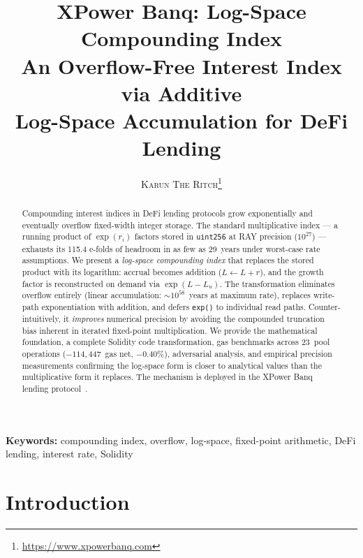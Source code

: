 \documentclass[10pt,a4paper,twocolumn]{article}
\title{\textbf{\Large XPower Banq: Log-Space Compounding Index}\\[0.3em]
\normalsize An Overflow-Free Interest Index via Additive\\Log-Space Accumulation for DeFi Lending}
\author{
    \textsc{Karun The Ritch}\thanks{\url{https://www.xpowerbanq.com}}
}
\date{}
\theoremstyle{definition}
\theoremstyle{plain}
\theoremstyle{remark}
\begin{document}
\maketitle


\begin{abstract}
Compounding interest indices in DeFi lending protocols grow exponentially and eventually overflow fixed-width integer storage. The standard multiplicative index --- a running product of $\exp(r_i)$ factors stored in \texttt{uint256} at RAY precision (${10^{27}}$) --- exhausts its 115.4 e-folds of headroom in as few as 29~years under worst-case rate assumptions. We present a \emph{log-space compounding index} that replaces the stored product with its logarithm: accrual becomes addition ($L \leftarrow L + r$), and the growth factor is reconstructed on demand via $\exp(L - L_u)$. The transformation eliminates overflow entirely (linear accumulation: ${\sim}10^{58}$~years at maximum rate), replaces write-path exponentiation with addition, and defers \texttt{exp()} to individual read paths. Counter-intuitively, it \emph{improves} numerical precision by avoiding the compounded truncation bias inherent in iterated fixed-point multiplication. We provide the mathematical foundation, a complete Solidity code transformation, gas benchmarks across 23~pool operations ($-114{,}447$~gas net, $-0.40\%$), adversarial analysis, and empirical precision measurements confirming the log-space form is closer to analytical values than the multiplicative form it replaces. The mechanism is deployed in the XPower Banq lending protocol~\cite{wp}.
\end{abstract}

\textbf{Keywords:} compounding index, overflow, log-space, fixed-point arithmetic, DeFi lending, interest rate, Solidity

\section{Introduction}
\label{sec:introduction}
\end{document}
